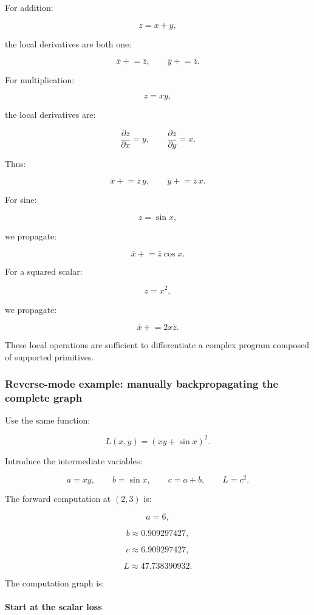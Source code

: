 For addition:

\[
z=x+y,
\]

the local derivatives are both one:

\[
\bar x\mathrel{+}=\bar z, \qquad \bar y\mathrel{+}=\bar z.
\]

For multiplication:

\[
z=xy,
\]

the local derivatives are:

\[
\frac{\partial z}{\partial x}=y, \qquad \frac{\partial z}{\partial y}=x.
\]

Thus:

\[
\boxed{ \bar x\mathrel{+}=\bar z\,y, \qquad \bar y\mathrel{+}=\bar z\,x }.
\]

For sine:

\[
z=\sin x,
\]

we propagate:

\[
\boxed{ \bar x\mathrel{+}=\bar z\cos x }.
\]

For a squared scalar:

\[
z=x^2,
\]

we propagate:

\[
\boxed{ \bar x\mathrel{+}=2x\bar z }.
\]

These local operations are sufficient to differentiate a complex program composed of supported primitives.

\subsubsection{Reverse-mode example: manually backpropagating the complete graph}\label{02-foundations-ii-ch022-reverse-mode-example-manually-backpropagating-the-complete-graph}

Use the same function:

\[
L(x,y)=(xy+\sin x)^2.
\]

Introduce the intermediate variables:

\[
a=xy,\qquad b=\sin x,\qquad c=a+b,\qquad L=c^2.
\]

The forward computation at \((2,3)\) is:

\[
a=6,
\]

\[
b\approx0.909297427,
\]

\[
c\approx6.909297427,
\]

\[
L\approx47.738390932.
\]

The computation graph is:

\paragraph{Start at the scalar loss}\label{02-foundations-ii-ch022-start-at-the-scalar-loss}

